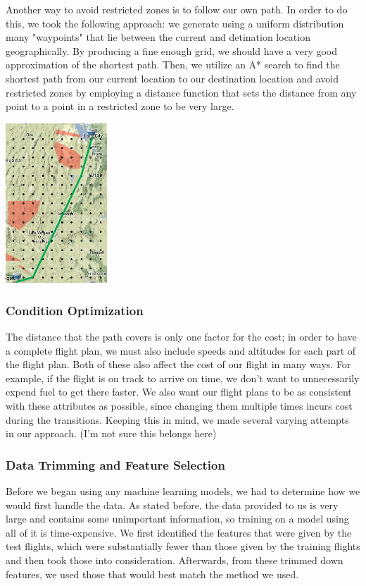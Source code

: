 \documentclass{article}[12pt]
\begin{document}
\begin{multicols}{2}
Another way to avoid restricted zones is to follow our own path. In order to do this, we took the following approach: we generate using a uniform distribution many "waypoints" that lie between the current and detination location geographically. By producing a fine enough grid, we should have a very good approximation of the shortest path. Then, we utilize an A* search to find the shortest path from our current location to our destination location and avoid restricted zones by employing a distance function that sets the distance from any point to a point in a restricted zone to be very large.
\begingroup
  \begin{center}
    \includegraphics[width=1.5in]{astar.png}
	\end{center}
\endgroup

\subsubsection{Condition Optimization}
The distance that the path covers is only one factor for the cost; in order to have a complete flight plan, we must also include speeds and altitudes for each part of the flight plan. Both of these also affect the cost of our flight in many ways. For example, if the flight is on track to arrive on time, we don't want to unnecessarily expend fuel to get there faster. We also want our flight plans to be as consistent with these attributes as possible, since changing them multiple times incurs cost during the transitions. Keeping this in mind, we made several varying attempts in our approach. (I'm not sure this belongs here)

\subsubsection{Data Trimming and Feature Selection}

Before we began using any machine learning models, we had to determine how we would first handle the data. As stated before, the data provided to us is very large and contains some unimportant information, so training on a model using all of it is time-expensive. We first identified the features that were given by the test flights, which were substantially fewer than those given by the training flights and then took those into consideration. Afterwards, from these trimmed down features, we used those that would best match the method we used. 



\end{multicols}
\end{document}

